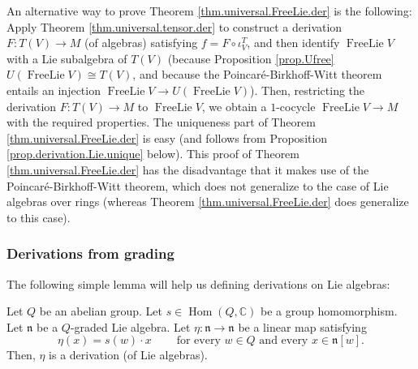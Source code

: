 \documentclass[etingof-lie.tex]{subfiles}
\begin{document}
An alternative way to prove Theorem \ref{thm.universal.FreeLie.der} is the
following: Apply Theorem \ref{thm.universal.tensor.der} to construct a
derivation $F:T\left(  V\right)  \rightarrow M$ (of algebras) satisfying
$f=F\circ\iota_{V}^{T}$, and then identify $\operatorname*{FreeLie}V$ with a
Lie subalgebra of $T\left(  V\right)  $ (because Proposition \ref{prop.Ufree}
$U\left(  \operatorname*{FreeLie}V\right)  \cong T\left(  V\right)  $, and
because the Poincar\'{e}-Birkhoff-Witt theorem entails an injection
$\operatorname*{FreeLie}V\rightarrow U\left(  \operatorname*{FreeLie}V\right)
$). Then, restricting the derivation $F:T\left(  V\right)  \rightarrow M$ to
$\operatorname*{FreeLie}V$, we obtain a $1$-cocycle $\operatorname*{FreeLie}%
V\rightarrow M$ with the required properties. The uniqueness part of Theorem
\ref{thm.universal.FreeLie.der} is easy (and follows from Proposition
\ref{prop.derivation.Lie.unique} below). This proof of Theorem
\ref{thm.universal.FreeLie.der} has the disadvantage that it makes use of the
Poincar\'{e}-Birkhoff-Witt theorem, which does not generalize to the case of
Lie algebras over rings (whereas Theorem \ref{thm.universal.FreeLie.der} does
generalize to this case).

\subsubsection{Derivations from grading}

The following simple lemma will help us defining derivations on Lie algebras:

\begin{lemma}
\label{lem.deriv.grading}Let $Q$ be an abelian group. Let $s\in
\operatorname*{Hom}\left(  Q,\mathbb{C}\right)  $ be a group homomorphism. Let
$\mathfrak{n}$ be a $Q$-graded Lie algebra. Let $\eta:\mathfrak{n}%
\rightarrow\mathfrak{n}$ be a linear map satisfying%
\begin{equation}
\eta\left(  x\right)  =s\left(  w\right)  \cdot x\ \ \ \ \ \ \ \ \ \ \text{for
every }w\in Q\text{ and every }x\in\mathfrak{n}\left[  w\right]  .
\label{lem.deriv.grading.1}%
\end{equation}
Then, $\eta$ is a derivation (of Lie algebras).
\end{lemma}
\end{document}
